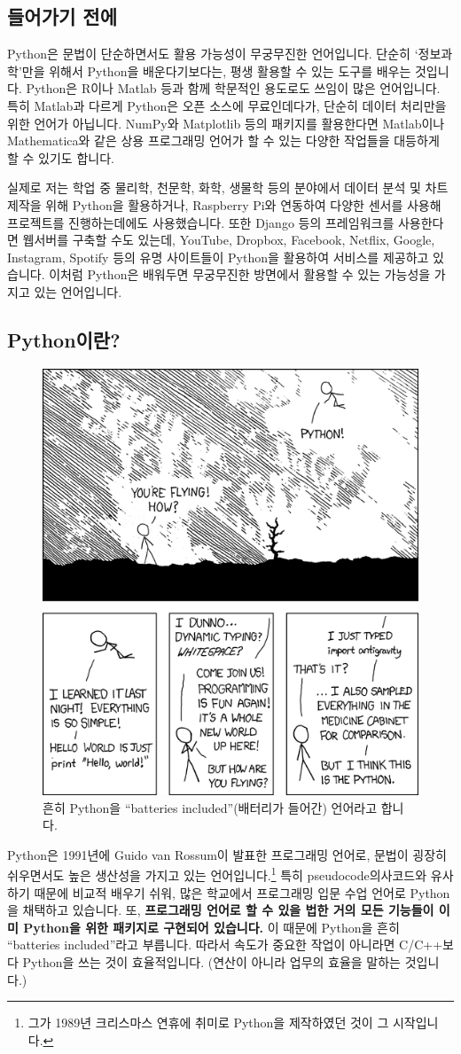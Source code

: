 \documentclass[../main.tex]{subfiles}
\begin{document}
\subsection{들어가기 전에}
Python은 문법이 단순하면서도 활용 가능성이 무궁무진한 언어입니다.
단순히 `정보과학'만을 위해서 Python을 배운다기보다는, 평생 활용할 수 있는 도구를 배우는 것입니다.
Python은 R이나 Matlab 등과 함께 학문적인 용도로도 쓰임이 많은 언어입니다.
특히 Matlab과 다르게 Python은 오픈 소스에 무료인데다가, 단순히 데이터 처리만을 위한 언어가 아닙니다.
NumPy와 Matplotlib 등의 패키지를 활용한다면 Matlab이나 Mathematica와 같은 상용 프로그래밍 언어가 할 수 있는 다양한 작업들을 대등하게 할 수 있기도 합니다.

실제로 저는 학업 중 물리학, 천문학, 화학, 생물학 등의 분야에서 데이터 분석 및 차트 제작을 위해 Python을 활용하거나, Raspberry Pi와 연동하여 다양한 센서를 사용해 프로젝트를 진행하는데에도 사용했습니다.
또한 Django 등의 프레임워크를 사용한다면 웹서버를 구축할 수도 있는데, YouTube, Dropbox, Facebook, Netflix, Google, Instagram, Spotify 등의 유명 사이트들이 Python을 활용하여 서비스를 제공하고 있습니다.
이처럼 Python은 배워두면 무궁무진한 방면에서 활용할 수 있는 가능성을 가지고 있는 언어입니다.

\subsection{Python이란?}
\begin{figure}[htbp]
    \centering
    \includegraphics[width=0.6\linewidth]{./figures/xkcd_python}
    \caption*{흔히 Python을 ``batteries included''(배터리가 들어간) 언어라고 합니다.}\label{fig:meme}
\end{figure}
Python은 1991년에 Guido van Rossum이 발표한 프로그래밍 언어로, 문법이 굉장히 쉬우면서도 높은 생산성을 가지고 있는 언어입니다.\footnote{그가 1989년 크리스마스 연휴에 취미로 Python을 제작하였던 것이 그 시작입니다.}
특히 pseudocode의사코드와 유사하기 때문에 비교적 배우기 쉬워, 많은 학교에서 프로그래밍 입문 수업 언어로 Python을 채택하고 있습니다.
또, \textbf{프로그래밍 언어로 할 수 있을 법한 거의 모든 기능들이 이미 Python을 위한 패키지로 구현되어 있습니다.}
이 때문에 Python을 흔히 ``batteries included''라고 부릅니다.
따라서 속도가 중요한 작업이 아니라면 C/C++보다 Python을 쓰는 것이 효율적입니다.
(연산이 아니라 업무의 효율을 말하는 것입니다.)
\end{document}

